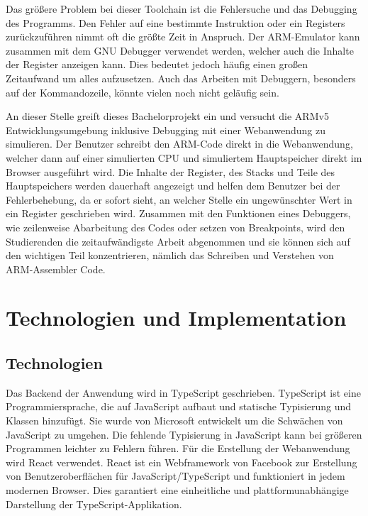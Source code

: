 \documentclass[a4paper, 11pt, onecolumn]{article}
\begin{document}
Das größere Problem bei dieser Toolchain ist die Fehlersuche und das Debugging des Programms. Den Fehler auf eine bestimmte Instruktion oder ein Registers zurückzuführen nimmt oft die größte Zeit in Anspruch. Der ARM-Emulator kann zusammen mit dem GNU Debugger \cite{gdb}  verwendet werden, welcher auch die Inhalte der Register anzeigen kann. Dies bedeutet jedoch häufig einen großen Zeitaufwand um alles aufzusetzen. Auch das Arbeiten mit Debuggern, besonders auf der Kommandozeile, könnte vielen noch nicht geläufig sein. 

An dieser Stelle greift dieses Bachelorprojekt ein und versucht die ARMv5 Entwicklungsumgebung inklusive Debugging mit einer Webanwendung zu simulieren. Der Benutzer schreibt den ARM-Code direkt in die Webanwendung, welcher dann auf einer simulierten CPU und simuliertem Hauptspeicher direkt im Browser ausgeführt wird. Die Inhalte der Register, des Stacks und Teile des Hauptspeichers werden dauerhaft angezeigt und helfen dem Benutzer bei der Fehlerbehebung, da er sofort sieht, an welcher Stelle ein ungewünschter Wert in ein Register geschrieben wird. Zusammen mit den Funktionen eines Debuggers, wie zeilenweise Abarbeitung des Codes oder setzen von Breakpoints, wird den Studierenden die zeitaufwändigste Arbeit abgenommen und sie können sich auf den wichtigen Teil konzentrieren, nämlich das Schreiben und Verstehen von ARM-Assembler Code.

\section{Technologien und Implementation}

\subsection{Technologien}

Das Backend der Anwendung wird in TypeScript geschrieben. TypeScript \cite{understandingtypescript}\cite{typescript} ist eine Programmiersprache, die auf JavaScript aufbaut und statische Typisierung und Klassen hinzufügt. Sie wurde von Microsoft entwickelt um die Schwächen von JavaScript zu umgehen. Die fehlende Typisierung in JavaScript kann bei größeren Programmen leichter zu Fehlern führen. Für die Erstellung der Webanwendung wird React verwendet. React \cite{react} ist ein Webframework von Facebook zur Erstellung von Benutzeroberflächen für JavaScript/TypeScript und funktioniert in jedem modernen Browser. Dies garantiert eine einheitliche und plattformunabhängige Darstellung der TypeScript-Applikation.
\end{document}
